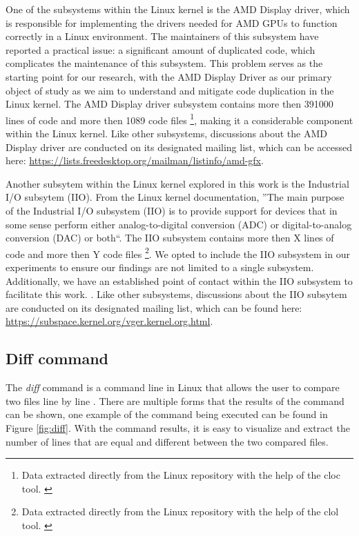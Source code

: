 One of the subsystems within the Linux kernel is the AMD Display driver, which
is responsible for implementing the drivers needed for AMD GPUs to function
correctly in a Linux environment. The maintainers of this subsystem have
reported a practical issue: a significant amount of duplicated code, which
complicates the maintenance of this subsystem. This problem serves as the
starting point for our research, with the AMD Display Driver as our primary
object of study as we aim to understand and mitigate code duplication in the
Linux kernel. The AMD Display driver subsystem contains more then 391000 lines 
of code and more then 1089 code files
\footnote{ 
Data extracted directly from the Linux repository with the help of the cloc tool.
\citep{cloc}
}, 
making it a considerable component within the Linux kernel. Like other 
subsystems, discussions about the AMD Display driver are conducted on its 
designated mailing list, which can be accessed here: 
\url{https://lists.freedesktop.org/mailman/listinfo/amd-gfx}.

Another subsytem within the Linux kernel explored in this work is the Industrial
I/O subsytem (IIO). From the Linux kernel documentation, ''The main purpose of the 
Industrial I/O subsystem (IIO) is to provide support for devices that in some sense 
perform either analog-to-digital conversion (ADC) or digital-to-analog conversion (DAC) or both``\citep{iiodoc}.
The IIO subsystem contains more then X lines of code and more then Y code files 
\footnote{
Data extracted directly from the Linux repository with the help of the clol tool. \citep{cloc}
}.
We opted to include the IIO subsystem in our experiments to ensure our findings are not limited to a single subsystem. 
Additionally, we have an established point of contact within the IIO subsystem to facilitate this work.
. Like other subsystems, discussions about the IIO subsytem are conducted on its 
designated mailing list, which can be found here: 
\url{https://subspace.kernel.org/vger.kernel.org.html}.

\subsection{Diff command}

The \textit{diff} command is a command line in Linux that allows the user to compare 
two files line by line \citep{diffcommand}. There are multiple forms 
that the results of the command can be shown, one example of the command being executed 
can be found in Figure \ref{fig:diff}. With the command results, it is easy to visualize and extract 
the number of lines that are equal and different between the two compared files.


